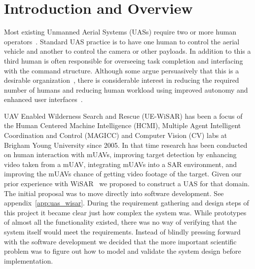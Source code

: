 \chapter{Introduction and Overview}

Most existing Unmanned Aerial Systems (UASs) require two or more human operators~\cite{GoodrichMorse2008,MurphyStoverPrattGriffin2006}. Standard UAS practice is to have one human to control the aerial vehicle and another to control the camera or other payloads. In addition to this a third human is often responsible for overseeing task completion and interfacing with the command structure. Although some argue persuasively that this is a desirable organization~\cite{MurphyBurke2010}, there is considerable interest in reducing the required number of humans and reducing human workload using improved autonomy and enhanced user interfaces~\cite{Cummings2007,MitchellCummings2005,goodrich2010fanout}.

UAV Enabled Wilderness Search and Rescue (UE-WiSAR) has been a focus of the Human
Centered Machine Intelligence (HCMI), Multiple Agent Intelligent Coordination and Control (MAGICC) and Computer Vision (CV) labs at Brigham Young University since 2005.  In that time research has been conducted on human interaction with mUAVs, improving target detection by enhancing video taken from a mUAV, integrating mUAVs into a SAR environment,
and improving the mUAVs chance of getting video footage of the target.   Given our prior experience with WiSAR~\cite{goodrich2009towards} we proposed to construct a UAS for that domain.  The initial proposal was to move directly into software development.  See appendix~\ref{app:uas_wisar}.  During the requirement gathering and design steps of this project it became clear just how complex the system was.  While prototypes of almost all the functionality existed, there was no way of verifying that the system itself would meet the requirements.  Instead of blindly pressing forward with the software development we decided that the more important scientific problem was to figure out how to model and validate the system design before implementation.

